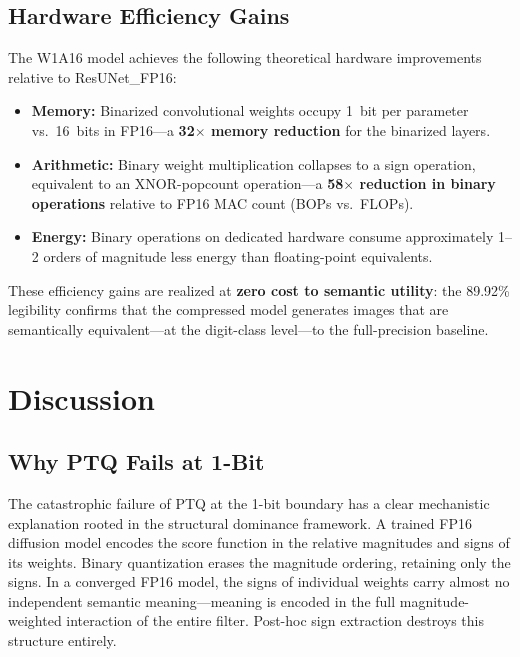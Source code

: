 \documentclass[conference]{IEEEtran}
\begin{document}
\subsection{Hardware Efficiency Gains}

The W1A16 model achieves the following theoretical hardware improvements relative to
ResUNet\_FP16:

\begin{itemize}
  \item \textbf{Memory:} Binarized convolutional weights occupy 1~bit per parameter
    vs.\ 16~bits in FP16---a \textbf{32$\times$ memory reduction} for the binarized
    layers.
  \item \textbf{Arithmetic:} Binary weight multiplication collapses to a sign operation,
    equivalent to an XNOR-popcount operation---a \textbf{58$\times$ reduction in binary
    operations} relative to FP16 MAC count (BOPs vs.\ FLOPs).
  \item \textbf{Energy:} Binary operations on dedicated hardware consume approximately
    1--2 orders of magnitude less energy than floating-point equivalents.
\end{itemize}

These efficiency gains are realized at \textbf{zero cost to semantic utility}: the
89.92\% legibility confirms that the compressed model generates images that are
semantically equivalent---at the digit-class level---to the full-precision baseline.

\section{Discussion}

\subsection{Why PTQ Fails at 1-Bit}

The catastrophic failure of PTQ at the 1-bit boundary has a clear mechanistic
explanation rooted in the structural dominance framework. A trained FP16 diffusion model
encodes the score function in the relative magnitudes and signs of its weights. Binary
quantization erases the magnitude ordering, retaining only the signs. In a converged
FP16 model, the signs of individual weights carry almost no independent semantic
meaning---meaning is encoded in the full magnitude-weighted interaction of the entire
filter. Post-hoc sign extraction destroys this structure entirely.
\end{document}
